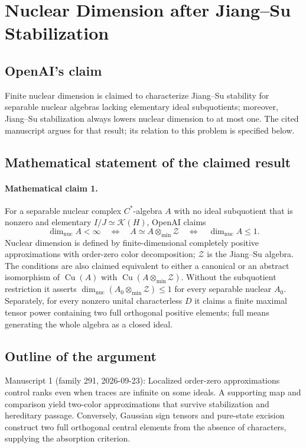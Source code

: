 \documentclass[11pt]{article}
\begin{document}
\section*{Nuclear Dimension after Jiang–Su Stabilization}

\subsection{OpenAI's claim}
Finite nuclear dimension is claimed to characterize Jiang--Su stability for separable nuclear algebras lacking elementary ideal subquotients; moreover, Jiang--Su stabilization always lowers nuclear dimension to at most one. The cited manuscript argues for that result; its relation to this problem is specified below.

\subsection{Mathematical statement of the claimed result}
\paragraph{Mathematical claim 1.} For a separable nuclear complex $C^*$-algebra $A$ with no ideal subquotient that is nonzero and elementary $I/J\simeq\mathcal K(H)$, OpenAI claims
\[
\dim_{\mathrm{nuc}}A<\infty\quad\Longleftrightarrow\quad
A\simeq A\otimes_{\min}\mathcal Z\quad\Longleftrightarrow\quad\dim_{\mathrm{nuc}}A\le1.
\]
Nuclear dimension is defined by finite-dimensional completely positive approximations with order-zero color decomposition; $\mathcal Z$ is the Jiang--Su algebra. The conditions are also claimed equivalent to either a canonical or an abstract isomorphism of $\operatorname{Cu}(A)$ with $\operatorname{Cu}(A\otimes_{\min}\mathcal Z)$. Without the subquotient restriction it asserts $\dim_{\mathrm{nuc}}(A_0\otimes_{\min}\mathcal Z)\le1$ for every separable nuclear $A_0$. Separately, for every nonzero unital characterless $D$ it claims a finite maximal tensor power containing two full orthogonal positive elements; full means generating the whole algebra as a closed ideal.

\subsection{Outline of the argument}
Manuscript 1 (family 291, 2026-09-23): Localized order-zero approximations control ranks even when traces are infinite on some ideals. A supporting map and comparison yield two-color approximations that survive stabilization and hereditary passage. Conversely, Gaussian sign tensors and pure-state excision construct two full orthogonal central elements from the absence of characters, supplying the absorption criterion.
\end{document}

